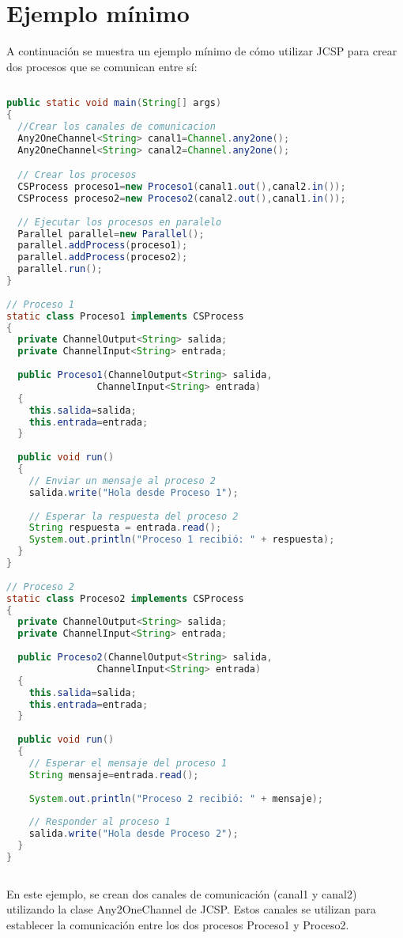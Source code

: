 \section*{Ejemplo mínimo}
A continuación se muestra un ejemplo mínimo de cómo utilizar JCSP para crear dos procesos que se comunican entre sí:
\begin{lstlisting}[language=Java, frame=single, caption={Ejemplo JCSP}]
	
public static void main(String[] args)
{
  //Crear los canales de comunicacion
  Any2OneChannel<String> canal1=Channel.any2one();
  Any2OneChannel<String> canal2=Channel.any2one();

  // Crear los procesos
  CSProcess proceso1=new Proceso1(canal1.out(),canal2.in());
  CSProcess proceso2=new Proceso2(canal2.out(),canal1.in());
		
  // Ejecutar los procesos en paralelo
  Parallel parallel=new Parallel();
  parallel.addProcess(proceso1);
  parallel.addProcess(proceso2);
  parallel.run();
}
	
// Proceso 1
static class Proceso1 implements CSProcess
{
  private ChannelOutput<String> salida;
  private ChannelInput<String> entrada;
		
  public Proceso1(ChannelOutput<String> salida, 
  				ChannelInput<String> entrada)
  {
    this.salida=salida;
	this.entrada=entrada;
  }
		
  public void run()
  {
    // Enviar un mensaje al proceso 2
    salida.write("Hola desde Proceso 1");
			
    // Esperar la respuesta del proceso 2
    String respuesta = entrada.read();
    System.out.println("Proceso 1 recibió: " + respuesta);
  }
}
	
// Proceso 2
static class Proceso2 implements CSProcess
{
  private ChannelOutput<String> salida;
  private ChannelInput<String> entrada;
		
  public Proceso2(ChannelOutput<String> salida,
  				ChannelInput<String> entrada)
  {
    this.salida=salida;
    this.entrada=entrada;
  }
		
  public void run()
  {
    // Esperar el mensaje del proceso 1
    String mensaje=entrada.read();
			
    System.out.println("Proceso 2 recibió: " + mensaje);
			
    // Responder al proceso 1
    salida.write("Hola desde Proceso 2");
  }
}
	
\end{lstlisting}
En este ejemplo, se crean dos canales de comunicación (canal1 y canal2) utilizando la clase Any2OneChannel de JCSP. Estos canales se utilizan para establecer la comunicación entre los dos procesos Proceso1 y Proceso2.
